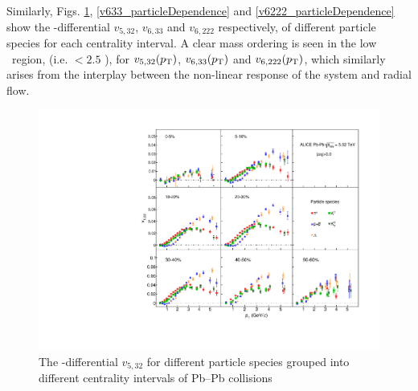 \documentclass[ALICE,manyauthors]{cernphprep}
\begin{document}
Similarly, Figs. \ref{v523_particleDependence}, \ref{v633_particleDependence} and \ref{v6222_particleDependence} show the \pT-differential $v_{5,32}$, $v_{6,33}$ and $v_{6,222}$ respectively, of different particle species for each centrality interval. A clear mass ordering is seen in the low \pT~region, (i.e. \pT $< 2.5$ \GeV), for $v_{5,32}(p_{\rm{T}})$, $v_{6,33}(p_{\rm{T}})$ and $v_{6,222}(p_{\rm{T}})$, which similarly arises from the interplay between the non-linear response of the system and radial flow. 

\begin{figure}[!htb]
\begin{center}
\includegraphics[scale=0.82]{figures/results/All_v523_gap00_PID2_3by3.pdf}

\end{center}
\caption{The \pT-differential $v_{5,32}$ for different particle species grouped into different centrality intervals of Pb--Pb collisions \sNN}
\label{v523_particleDependence}
\end{figure}
\end{document}
